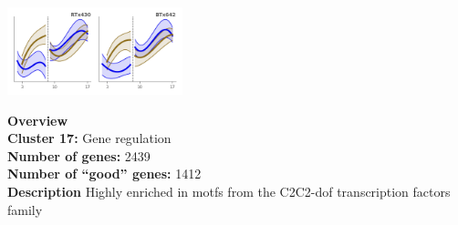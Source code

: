 \begin{multicols}{2}
\includegraphics[width=2in]{figures/clusters/root_Preflowering_16.png}
\columnbreak

\noindent \textbf{Overview}\\\textbf{Cluster 17:} Gene regulation \\
\textbf{Number of genes:} 2439 \\
\textbf{Number of ``good'' genes:} 1412 \\
\textbf{Description} Highly enriched in motfs from the C2C2-dof transcription factors family \\
\end{multicols}

